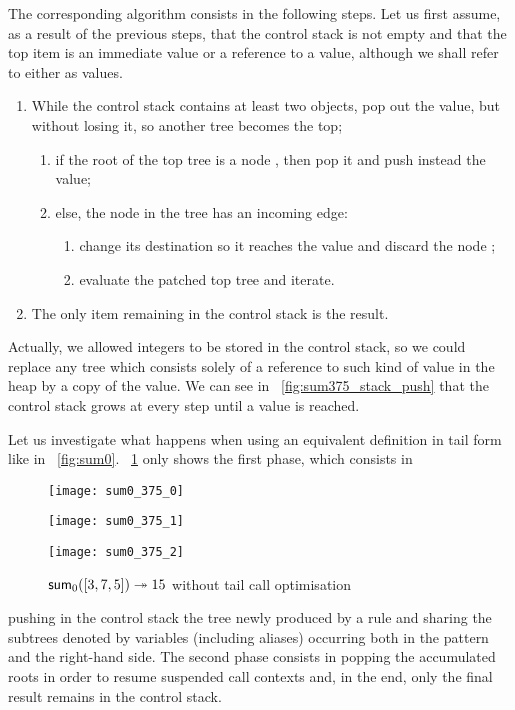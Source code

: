 The corresponding algorithm consists in the following steps. Let us
first assume, as a result of the previous steps, that the control
stack is not empty and that the top item is an immediate value or a
reference to a value, although we shall refer to either as values.
\begin{enumerate}

  \item While the control stack contains at least two objects, pop out
    the value, but without losing it, so another tree becomes the top;
    \begin{enumerate}

    \item if the root of the top tree is a node , then
      pop it and push instead the value;

    \item else, the node  in the tree has an incoming edge:
      \begin{enumerate}

      \item change its destination so it reaches the value and discard
        the node ;

      \item evaluate the patched top tree and iterate.

      \end{enumerate}

    \end{enumerate}

  \item The only item remaining in the control stack is the result.

\end{enumerate}
Actually, we allowed integers to be stored in the control stack, so we could replace any tree which consists solely of a reference to such kind of value in the heap by a copy of the value.  We can see in \fig~\ref{fig:sum375_stack_push} that the control stack grows at every step until a value is reached.   


Let us investigate what happens when using an equivalent definition in
tail form like  in \fig~\vref{fig:sum0}.
\Fig~\ref{fig:sum0_375} only shows the first phase, which consists in
\begin{figure}[!t]
\centering
\texttt{[image: sum0\_375\_0]}

\texttt{[image: sum0\_375\_1]}

\texttt{[image: sum0\_375\_2]}
\caption{\(\textsf{sum}_0([3,7,5]) \twoheadrightarrow 15\)
without tail call optimisation\label{fig:sum0_375}}
\end{figure}
pushing in the control stack the tree newly produced by a rule and
sharing the subtrees denoted by variables (including aliases)
occurring both in the pattern and the right\hyp{}hand side. The second
phase consists in popping the accumulated roots in order to resume
suspended call contexts and, in the end, only the final result remains
in the control stack.

